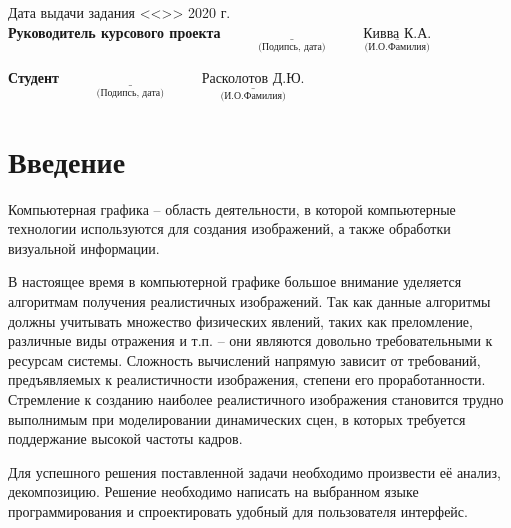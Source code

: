 \documentclass[12pt,a4paper,oneside]{report}
\begin{document}
	
	\begin{flushleft}
		\small Дата выдачи задания <<\underline{\hspace{1cm}}>> \underline{\hspace{3cm}} 2020 г.
		\\ \small \textbf{Руководитель курсового проекта}
		\small \hspace{2.65cm}$\underset{\text{(Подипсь, дата)}}{\underline{\hspace{4cm}}}$ 
		\small \hspace{4mm}$\underset{\text{(И.О.Фамилия)}}{\underline{\text{Кивва К.А.}}}$ 
	\end{flushleft}
	\begin{flushleft}
		\small \textbf{Студент}
		\small \hspace{7.7cm}$\underset{\text{(Подипсь, дата)}}{\underline{\hspace{4cm}}}$ 
		\small \hspace{3.5mm}$\underset{\text{(И.О.Фамилия)}}{\underline{\text{Расколотов Д.Ю.}}}$ 
	\end{flushleft}
	
	\renewcommand*\contentsname{Содержание}
	\tableofcontents
	\setcounter{page}{1}
	\newpage
	
	\chapter*{Введение}
	
	\quad Компьютерная графика -- область деятельности, в которой компьютерные технологии используются для создания изображений, а также обработки визуальной информации. 
	
	 В настоящее время в компьютерной графике большое внимание уделяется алгоритмам получения реалистичных изображений. Так как данные алгоритмы должны учитывать множество физических явлений, таких как преломление, различные виды отражения и т.п. -- они являются довольно требовательными к ресурсам системы. Сложность вычислений напрямую зависит от требований, предъявляемых к реалистичности изображения, степени его проработанности. Стремление к созданию наиболее реалистичного изображения становится трудно выполнимым при моделировании динамических сцен, в которых требуется поддержание высокой частоты кадров. 
	
	
	 Для успешного решения поставленной задачи необходимо произвести её анализ, декомпозицию. Решение необходимо написать на выбранном языке программирования и спроектировать удобный для пользователя интерфейс. 
	
\end{document}
